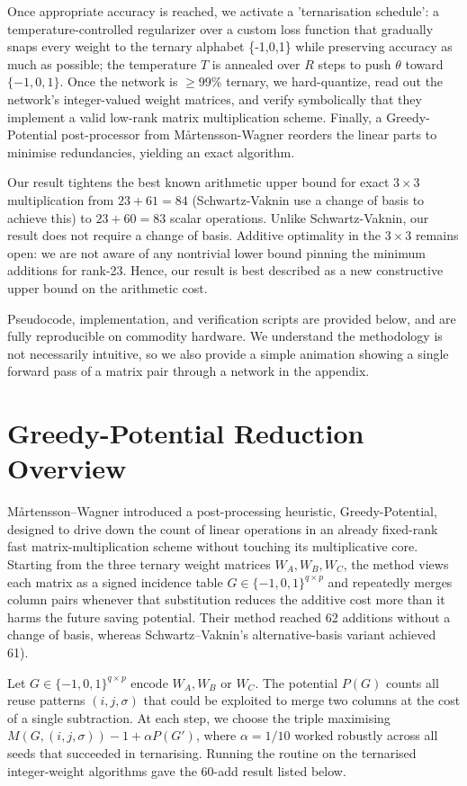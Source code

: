 \documentclass[11pt]{article}
\begin{document}
Once appropriate accuracy is reached, we activate a 'ternarisation schedule': a temperature-controlled regularizer over a custom loss function that gradually snaps every weight to the ternary alphabet \{-1,0,1\} while preserving accuracy as much as possible; the temperature $T$ is annealed over $R$ steps to push $\theta$ toward $\{-1,0,1\}$. Once the network is $\geq$99\% ternary, we hard-quantize, read out the network's integer-valued weight matrices, and verify symbolically that they implement a valid low-rank matrix multiplication scheme. Finally, a Greedy-Potential post-processor from M\aa rtensson-Wagner reorders the linear parts to minimise redundancies, yielding an exact algorithm. 

Our result tightens the best known arithmetic upper bound for exact $3\times3$ multiplication from $23+61=84$ (Schwartz-Vaknin use a change of basis to achieve this) to $23+60=83$ scalar operations. Unlike Schwartz-Vaknin, our result does not require a change of basis. Additive optimality in the $3\times3$ remains open: we are not aware of any nontrivial lower bound pinning the minimum additions for rank-23. Hence, our result is best described as a new constructive upper bound on the arithmetic cost. 

Pseudocode, implementation, and verification scripts are provided below, and are fully reproducible on commodity hardware. We understand the methodology is not necessarily intuitive, so we also provide a simple animation showing a single forward pass of a matrix pair through a network in the appendix.

\section{Greedy-Potential Reduction Overview}
M\aa rtensson–Wagner introduced a post-processing heuristic, Greedy-Potential, designed to drive down the count of linear operations in an already fixed-rank fast matrix-multiplication scheme without touching its multiplicative core. Starting from the three ternary weight matrices $W_A,W_B,W_C$, the method views each matrix as a signed incidence table $G\in\{-1,0,1\}^{q\times p}$ and repeatedly merges column pairs whenever that substitution reduces the additive cost more than it harms the future saving potential. Their method reached 62 additions without a  change of basis, whereas Schwartz–Vaknin’s alternative-basis variant achieved 61).

Let $G\in\{-1,0,1\}^{q\times p}$ encode $W_A,W_B$ or $W_C$. The potential $P(G)$ counts all reuse patterns $(i,j,\sigma)$ that could be exploited to merge two columns at the cost of a single subtraction. At each step, we choose the triple maximising $M(G,(i,j,\sigma))-1+\alpha P(G')$, where $\alpha=1/10$ worked robustly across all seeds that succeeded in ternarising. Running the routine on the ternarised integer-weight algorithms gave the $60$-add result listed below.
\end{document}
